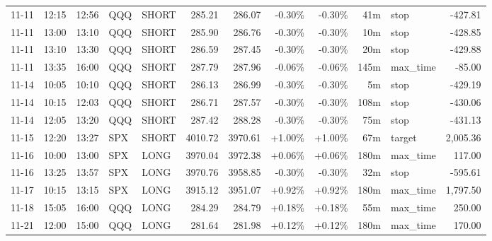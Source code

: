 \documentclass[11pt,a4paper,twoside]{article}
\begin{document}
\begin{center}
\begin{longtable}{>{\color{txtmain}}l l l l l r r r r r >{\color{txtmain}}l r}
11-11 & 12:15 & 12:56 & QQQ & SHORT & 285.21 & 286.07 & \textcolor{lossred}{-0.30\%} & \textcolor{lossred}{-0.30\%} & 41m & stop & \textcolor{lossred}{-427.81} \\
11-11 & 13:00 & 13:10 & QQQ & SHORT & 285.90 & 286.76 & \textcolor{lossred}{-0.30\%} & \textcolor{lossred}{-0.30\%} & 10m & stop & \textcolor{lossred}{-428.85} \\
11-11 & 13:10 & 13:30 & QQQ & SHORT & 286.59 & 287.45 & \textcolor{lossred}{-0.30\%} & \textcolor{lossred}{-0.30\%} & 20m & stop & \textcolor{lossred}{-429.88} \\
11-11 & 13:35 & 16:00 & QQQ & SHORT & 287.79 & 287.96 & \textcolor{lossred}{-0.06\%} & \textcolor{lossred}{-0.06\%} & 145m & max\_time & \textcolor{lossred}{-85.00} \\
11-14 & 10:05 & 10:10 & QQQ & SHORT & 286.13 & 286.99 & \textcolor{lossred}{-0.30\%} & \textcolor{lossred}{-0.30\%} & 5m & stop & \textcolor{lossred}{-429.19} \\
11-14 & 10:15 & 12:03 & QQQ & SHORT & 286.71 & 287.57 & \textcolor{lossred}{-0.30\%} & \textcolor{lossred}{-0.30\%} & 108m & stop & \textcolor{lossred}{-430.06} \\
11-14 & 12:05 & 13:20 & QQQ & SHORT & 287.42 & 288.28 & \textcolor{lossred}{-0.30\%} & \textcolor{lossred}{-0.30\%} & 75m & stop & \textcolor{lossred}{-431.13} \\
11-15 & 12:20 & 13:27 & SPX & SHORT & 4010.72 & 3970.61 & \textcolor{wingreen}{+1.00\%} & \textcolor{wingreen}{+1.00\%} & 67m & target & \textcolor{wingreen}{2,005.36} \\
11-16 & 10:00 & 13:00 & SPX & LONG & 3970.04 & 3972.38 & \textcolor{wingreen}{+0.06\%} & \textcolor{wingreen}{+0.06\%} & 180m & max\_time & \textcolor{wingreen}{117.00} \\
11-16 & 13:25 & 13:57 & SPX & LONG & 3970.76 & 3958.85 & \textcolor{lossred}{-0.30\%} & \textcolor{lossred}{-0.30\%} & 32m & stop & \textcolor{lossred}{-595.61} \\
11-17 & 10:15 & 13:15 & SPX & LONG & 3915.12 & 3951.07 & \textcolor{wingreen}{+0.92\%} & \textcolor{wingreen}{+0.92\%} & 180m & max\_time & \textcolor{wingreen}{1,797.50} \\
11-18 & 15:05 & 16:00 & QQQ & LONG & 284.29 & 284.79 & \textcolor{wingreen}{+0.18\%} & \textcolor{wingreen}{+0.18\%} & 55m & max\_time & \textcolor{wingreen}{250.00} \\
11-21 & 12:00 & 15:00 & QQQ & LONG & 281.64 & 281.98 & \textcolor{wingreen}{+0.12\%} & \textcolor{wingreen}{+0.12\%} & 180m & max\_time & \textcolor{wingreen}{170.00} \\

\end{longtable}
\end{center}
\end{document}
